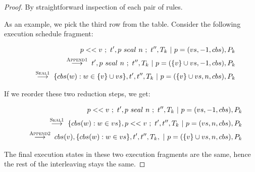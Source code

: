 \documentclass[runningheads,a4paper]{llncs}
\newcommand{\set}[1]{\{#1\}}
\begin{document}
\begin{proof}
By straightforward inspection of each pair of rules.

As an example, we pick the third row from the table. Consider the
following execution schedule fragment:

\begin{eqnarray*}
& &
p << v~;~t',p~seal~n~;~t'',T_k~|~p=(vs,-1,cbs),P_k
\\
& &
\;\stackrel{\textsc{Append1}}{\longrightarrow}\;
t',p~seal~n~;~t'',T_k~|~p=(\set{v} \cup vs,-1,cbs),P_k
\\
& &
\;\stackrel{\textsc{Seal1}}{\longrightarrow}\;
\set{cbs(w) : w \in \set{v} \cup vs},t',t'',T_k~|~p=(\set{v} \cup vs,n,cbs),P_k
\end{eqnarray*}

If we reorder these two reduction steps, we get:

\begin{eqnarray*}
& &
p << v~;~t',p~seal~n~;~t'',T_k~|~p=(vs,-1,cbs),P_k
\\
& &
\;\stackrel{\textsc{Seal1}}{\longrightarrow}\;
\set{cbs(w) : w \in vs},p << v~;~t',t'',T_k~|~p=(vs,n,cbs),P_k
\\
& &
\;\stackrel{\textsc{Append2}}{\longrightarrow}\;
cbs(v),\set{cbs(w) : w \in vs},t',t'',T_k,~|~p=(\set{v} \cup vs,n,cbs),P_k
\end{eqnarray*}

The final execution states in these two execution fragments are the
same, hence the rest of the interleaving stays the same.
\end{proof}
\end{document}
